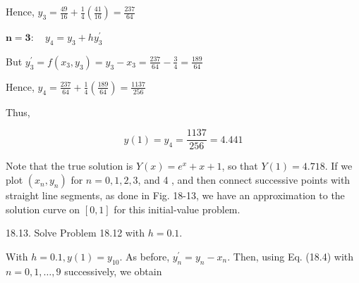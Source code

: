 \documentclass[10pt]{article}
\begin{document}
Hence, $y_{3}=\frac{49}{16}+\frac{1}{4}\left(\frac{41}{16}\right)=\frac{237}{64}$

$\mathbf{n}=\mathbf{3}: \quad y_{4}=y_{3}+h y_{3}^{\prime}$

But $y_{3}^{\prime}=f\left(x_{3}, y_{3}\right)=y_{3}-x_{3}=\frac{237}{64}-\frac{3}{4}=\frac{189}{64}$

Hence, $y_{4}=\frac{237}{64}+\frac{1}{4}\left(\frac{189}{64}\right)=\frac{1137}{256}$

Thus,

$$
y(1)=y_{4}=\frac{1137}{256}=4.441
$$

Note that the true solution is $Y(x)=e^{x}+x+1$, so that $Y(1)=4.718$. If we plot $\left(x_{n}, y_{n}\right)$ for $n=0,1,2,3$, and 4 , and then connect successive points with straight line segments, as done in Fig. 18-13, we have an approximation to the solution curve on $[0,1]$ for this initial-value problem.

18.13. Solve Problem 18.12 with $h=0.1$.

With $h=0.1, y(1)=y_{10}$. As before, $y_{n}^{\prime}=y_{n}-x_{n}$. Then, using Eq. (18.4) with $n=0,1, \ldots, 9$ successively, we obtain
\end{document}

